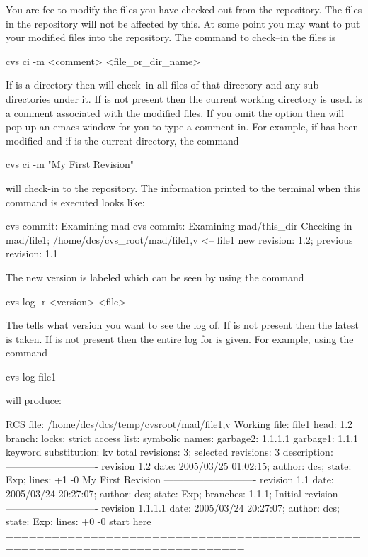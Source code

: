 You are fee to modify the files you have checked out from the
repository. The files in the repository will not be affected by this.
At some point you may want to put your modified files into the
repository. The command to check--in the files is
\begin{example}
  cvs ci -m <comment> <file_or_dir_name>
\end{example}
If  is a directory then \cvs will check--in all
files of that directory and any sub--directories under it. If
 is not present then the current working
directory is used.  is a comment associated with the
modified files. If you omit the  option then \cvs
will pop up an emacs window for you to type a comment in.
For example, if  has been modified
and if  is the current directory, the command
\begin{example}
  cvs ci -m "My First Revision"
\end{example}
will check-in  to the repository. The information printed to
the terminal when this command is executed looks like:
\begin{example}
  cvs commit: Examining mad
  cvs commit: Examining mad/this_dir
  Checking in mad/file1;
  /home/dcs/cvs_root/mad/file1,v  <--  file1
  new revision: 1.2; previous revision: 1.1
\end{example}
The new version is labeled  which can be seen by using the command
\begin{example}
  cvs log -r <version> <file>
\end{example}
The  tells \cvs what version you want to see the log
of. If  is not present then the latest is taken. If
 is not present then the entire log for  is
given. For example, using the command 
\begin{example}
  cvs log file1
\end{example}
will produce:
\begin{example}
  RCS file: /home/dcs/dcs/temp/cvsroot/mad/file1,v
  Working file: file1
  head: 1.2
  branch:
  locks: strict
  access list:
  symbolic names:
          garbage2: 1.1.1.1
          garbage1: 1.1.1
  keyword substitution: kv
  total revisions: 3;     selected revisions: 3
  description:
  ----------------------------
  revision 1.2
  date: 2005/03/25 01:02:15;  author: dcs;  state: Exp;  lines: +1 -0
  My First Revision
  ----------------------------
  revision 1.1
  date: 2005/03/24 20:27:07;  author: dcs;  state: Exp;
  branches:  1.1.1;
  Initial revision
  ----------------------------
  revision 1.1.1.1
  date: 2005/03/24 20:27:07;  author: dcs;  state: Exp;  lines: +0 -0
  start here
  =============================================================================
\end{example}
